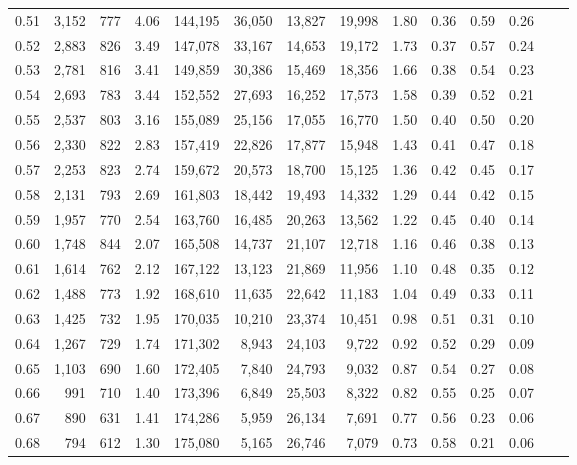 \begin{tabular}{rrrrrrrrrrrrrr}
0.51 &  3,152 &  777 &    4.06 &  144,195 &   36,050 &  13,827 &  19,998 &  1.80 &  0.36 &  0.59 &      0.26 \\
0.52 &  2,883 &  826 &    3.49 &  147,078 &   33,167 &  14,653 &  19,172 &  1.73 &  0.37 &  0.57 &      0.24 \\
0.53 &  2,781 &  816 &    3.41 &  149,859 &   30,386 &  15,469 &  18,356 &  1.66 &  0.38 &  0.54 &      0.23 \\
0.54 &  2,693 &  783 &    3.44 &  152,552 &   27,693 &  16,252 &  17,573 &  1.58 &  0.39 &  0.52 &      0.21 \\
0.55 &  2,537 &  803 &    3.16 &  155,089 &   25,156 &  17,055 &  16,770 &  1.50 &  0.40 &  0.50 &      0.20 \\
0.56 &  2,330 &  822 &    2.83 &  157,419 &   22,826 &  17,877 &  15,948 &  1.43 &  0.41 &  0.47 &      0.18 \\
0.57 &  2,253 &  823 &    2.74 &  159,672 &   20,573 &  18,700 &  15,125 &  1.36 &  0.42 &  0.45 &      0.17 \\
0.58 &  2,131 &  793 &    2.69 &  161,803 &   18,442 &  19,493 &  14,332 &  1.29 &  0.44 &  0.42 &      0.15 \\
0.59 &  1,957 &  770 &    2.54 &  163,760 &   16,485 &  20,263 &  13,562 &  1.22 &  0.45 &  0.40 &      0.14 \\
0.60 &  1,748 &  844 &    2.07 &  165,508 &   14,737 &  21,107 &  12,718 &  1.16 &  0.46 &  0.38 &      0.13 \\
0.61 &  1,614 &  762 &    2.12 &  167,122 &   13,123 &  21,869 &  11,956 &  1.10 &  0.48 &  0.35 &      0.12 \\
0.62 &  1,488 &  773 &    1.92 &  168,610 &   11,635 &  22,642 &  11,183 &  1.04 &  0.49 &  0.33 &      0.11 \\
0.63 &  1,425 &  732 &    1.95 &  170,035 &   10,210 &  23,374 &  10,451 &  0.98 &  0.51 &  0.31 &      0.10 \\
0.64 &  1,267 &  729 &    1.74 &  171,302 &    8,943 &  24,103 &   9,722 &  0.92 &  0.52 &  0.29 &      0.09 \\
0.65 &  1,103 &  690 &    1.60 &  172,405 &    7,840 &  24,793 &   9,032 &  0.87 &  0.54 &  0.27 &      0.08 \\
0.66 &    991 &  710 &    1.40 &  173,396 &    6,849 &  25,503 &   8,322 &  0.82 &  0.55 &  0.25 &      0.07 \\
0.67 &    890 &  631 &    1.41 &  174,286 &    5,959 &  26,134 &   7,691 &  0.77 &  0.56 &  0.23 &      0.06 \\
0.68 &    794 &  612 &    1.30 &  175,080 &    5,165 &  26,746 &   7,079 &  0.73 &  0.58 &  0.21 &      0.06 \\

\end{tabular}

